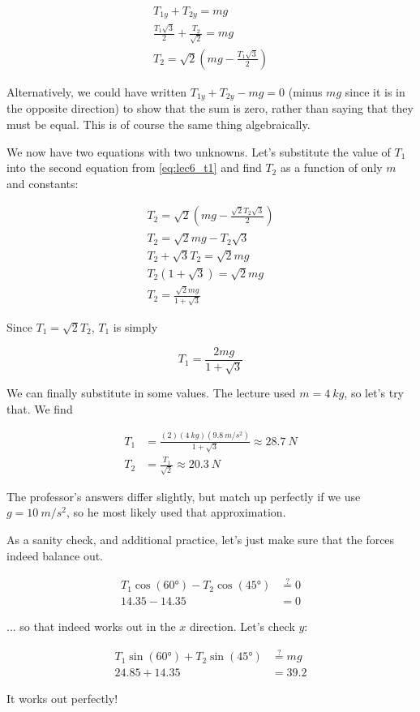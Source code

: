 \begin{align}
T_{1y} + T_{2y} = m g\\
\frac{T_1 \sqrt{3}}{2} + \frac{T_2}{\sqrt{2}} = m g\\
T_2 = \sqrt{2}\left(m g - \frac{T_1 \sqrt{3}}{2}\right)
\end{align}

Alternatively, we could have written $T_{1y} + T_{2y} - m g = 0$ (minus $m g$ since it is in the opposite direction) to show that the sum is zero, rather than saying that they must be equal. This is of course the same thing algebraically.

We now have two equations with two unknowns. Let's substitute the value of $T_1$ into the second equation from \eqref{eq:lec6_t1} and find $T_2$ as a function of only $m$ and constants:

\begin{align}
T_2 = \sqrt{2}\left(m g - \frac{\sqrt{2} T_2 \sqrt{3}}{2}\right)\\
T_2 = \sqrt{2} m g - T_2 \sqrt{3}\\
T_2 + \sqrt{3} T_2 = \sqrt{2} m g\\
T_2 (1 + \sqrt{3}) = \sqrt{2} m g\\
T_2 = \frac{\sqrt{2} m g}{1 + \sqrt{3}}
\end{align}

Since $T_1 = \sqrt{2} T_2$, $T_1$ is simply

\begin{equation}
T_1 = \frac{2 m g}{1 + \sqrt{3}}
\end{equation}

We can finally substitute in some values. The lecture used $m = \SI{4}{kg}$, so let's try that. We find

\begin{align}
T_1 &= \frac{(2)(\SI{4}{kg})(\SI{9.8}{m/s^2})}{1 + \sqrt{3}} \approx \SI{28.7}{N}\\
T_2 &= \frac{T_1}{\sqrt{2}} \approx \SI{20.3}{N}
\end{align}

The professor's answers differ slightly, but match up perfectly if we use $g = \SI{10}{m/s^2}$, so he most likely used that approximation.

As a sanity check, and additional practice, let's just make sure that the forces indeed balance out.

\begin{align}
T_1 \cos(\ang{60}) - T_2 \cos(\ang{45}) &\overset{?}{=} 0\\
14.35 - 14.35 &= 0
\end{align}

... so that indeed works out in the $x$ direction. Let's check $y$:

\begin{align}
T_1 \sin(\ang{60}) + T_2 \sin(\ang{45}) &\overset{?}{=} m g\\
24.85 + 14.35 &= 39.2
\end{align}

It works out perfectly!
